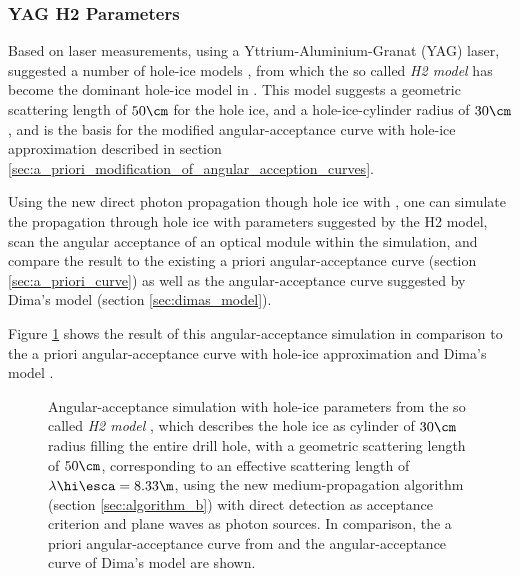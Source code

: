 \subsubsection{YAG H2 Parameters}
\label{sec:yag_h2_parameters}
Based on laser measurements, using a Yttrium-Aluminium-Granat (YAG) laser,  suggested a number of hole-ice models \cite{holeicestudieswithyag}, from which the so called \textit{H2 model} has become the dominant hole-ice model in \icecube. This model suggests a geometric scattering length of $50\cm$ for the hole ice, and a hole-ice-cylinder radius of $30\cm$, and is the basis for the modified angular-acceptance curve with hole-ice approximation described in section \ref{sec:a_priori_modification_of_angular_acception_curves}.

Using the new direct photon propagation though hole ice with \clsim, one can simulate the propagation through hole ice with parameters suggested by the H2 model, scan the angular acceptance of an optical module within the simulation, and compare the result to the existing a priori angular-acceptance curve (section \ref{sec:a_priori_curve}) as well as the angular-acceptance curve suggested by Dima's model (section \ref{sec:dimas_model}).


Figure \ref{fig:xaeg2Mee} shows the result of this angular-acceptance simulation in comparison to the a priori angular-acceptance curve with hole-ice approximation \cite{icepaper} and Dima's model \cite{flasherdataderivedicemodels}.

\begin{figure}[htbp]
  \caption{Angular-acceptance simulation with hole-ice parameters from the so called \textit{H2 model} \cite{holeicestudieswithyag}, which describes the hole ice as cylinder of $30\cm$ radius filling the entire drill hole, with a geometric scattering length of $50\cm$, corresponding to an effective scattering length of $\lambda\hi\esca = 8.33\m$, using the new medium-propagation algorithm (section \ref{sec:algorithm_b}) with direct detection as acceptance criterion and plane waves as photon sources. In comparison, the a priori angular-acceptance curve from \cite{icepaper} and the angular-acceptance curve of Dima's model \cite{flasherdataderivedicemodels} are shown.}
  \label{fig:xaeg2Mee}
\end{figure}

